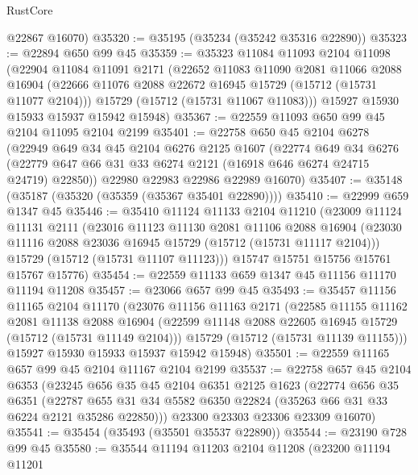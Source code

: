 \begin{lexlean}{RustCore}
\begin{coremodule}
      @22867
      @16070)
@35320 := @35195 (@35234 (@35242 @35316 @22890))
@35323 := @22894 @650 @99 @45
@35359 := @35323
    @11084
    @11093
    @2104
    @11098
    (@22904
      @11084
      @11091
      @2171
      (@22652
        @11083
        @11090
        @2081
        @11066
        @2088
        @16904
        (@22666 @11076 @2088 @22672 @16945 @15729 (@15712 (@15731 @11077 @2104)))
        @15729
        (@15712 (@15731 @11067 @11083)))
      @15927
      @15930
      @15933
      @15937
      @15942
      @15948)
@35367 := @22559 @11093 @650 @99 @45 @2104 @11095 @2104 @2199
@35401 := @22758
    @650
    @45
    @2104
    @6278
    (@22949
      @649
      @34
      @45
      @2104
      @6276
      @2125
      @1607
      (@22774
        @649
        @34
        @6276
        (@22779 @647 @66 @31 @33 @6274 @2121 (@16918 @646 @6274 @24715 @24719) @22850))
      @22980
      @22983
      @22986
      @22989
      @16070)
@35407 := @35148 (@35187 (@35320 (@35359 (@35367 @35401 @22890))))
@35410 := @22999 @659 @1347 @45
@35446 := @35410
    @11124
    @11133
    @2104
    @11210
    (@23009
      @11124
      @11131
      @2111
      (@23016
        @11123
        @11130
        @2081
        @11106
        @2088
        @16904
        (@23030 @11116 @2088 @23036 @16945 @15729 (@15712 (@15731 @11117 @2104)))
        @15729
        (@15712 (@15731 @11107 @11123)))
      @15747
      @15751
      @15756
      @15761
      @15767
      @15776)
@35454 := @22559 @11133 @659 @1347 @45 @11156 @11170 @11194 @11208
@35457 := @23066 @657 @99 @45
@35493 := @35457
    @11156
    @11165
    @2104
    @11170
    (@23076
      @11156
      @11163
      @2171
      (@22585
        @11155
        @11162
        @2081
        @11138
        @2088
        @16904
        (@22599 @11148 @2088 @22605 @16945 @15729 (@15712 (@15731 @11149 @2104)))
        @15729
        (@15712 (@15731 @11139 @11155)))
      @15927
      @15930
      @15933
      @15937
      @15942
      @15948)
@35501 := @22559 @11165 @657 @99 @45 @2104 @11167 @2104 @2199
@35537 := @22758
    @657
    @45
    @2104
    @6353
    (@23245
      @656
      @35
      @45
      @2104
      @6351
      @2125
      @1623
      (@22774
        @656
        @35
        @6351
        (@22787 @655 @31 @34 @5582 @6350 @22824 (@35263 @66 @31 @33 @6224 @2121 @35286 @22850)))
      @23300
      @23303
      @23306
      @23309
      @16070)
@35541 := @35454 (@35493 (@35501 @35537 @22890))
@35544 := @23190 @728 @99 @45
@35580 := @35544
    @11194
    @11203
    @2104
    @11208
    (@23200
      @11194
      @11201

\end{coremodule}
\end{lexlean}

